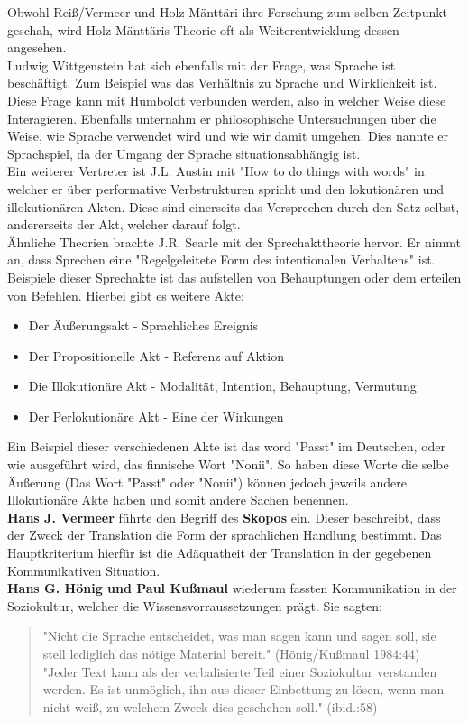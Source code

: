 \documentclass{article}
\begin{document}
	Obwohl Reiß/Vermeer und Holz-Mänttäri ihre Forschung zum selben Zeitpunkt geschah, wird Holz-Mänttäris Theorie oft als Weiterentwicklung dessen angesehen. \\
	Ludwig Wittgenstein hat sich ebenfalls mit der Frage, was Sprache ist beschäftigt. Zum Beispiel was das Verhältnis zu Sprache und Wirklichkeit ist. Diese Frage kann mit Humboldt verbunden werden, also in welcher Weise diese Interagieren. Ebenfalls unternahm er philosophische Untersuchungen über die Weise, wie Sprache verwendet wird und wie wir damit umgehen. Dies nannte er Sprachspiel, da der Umgang der Sprache situationsabhängig ist. \\
	Ein weiterer Vertreter ist J.L. Austin mit "How to do things with words" in welcher er über performative Verbstrukturen spricht und den lokutionären und illokutionären Akten. Diese sind einerseits das Versprechen durch den Satz selbst, andererseits der Akt, welcher darauf folgt. \\
	Ähnliche Theorien brachte J.R. Searle mit der Sprechakttheorie hervor. Er nimmt an, dass Sprechen eine "Regelgeleitete Form des intentionalen Verhaltens" ist. Beispiele dieser Sprechakte ist das aufstellen von Behauptungen oder dem erteilen von Befehlen.
	Hierbei gibt es weitere Akte:
	\begin{itemize}
		\item{Der Äußerungsakt - Sprachliches Ereignis}
		\item{Der Propositionelle Akt - Referenz auf Aktion}
		\item{Die Illokutionäre Akt - Modalität, Intention, Behauptung, Vermutung}
		\item{Der Perlokutionäre Akt - Eine der Wirkungen}
	\end{itemize}

	Ein Beispiel dieser verschiedenen Akte ist das word "Passt" im Deutschen, oder wie ausgeführt wird, das finnische Wort "Nonii". So haben diese Worte die selbe Äußerung (Das Wort "Passt" oder "Nonii") können jedoch jeweils andere Illokutionäre Akte haben und somit andere Sachen benennen. \\
	\textbf{Hans J. Vermeer} führte den Begriff des \textbf{Skopos} ein. Dieser beschreibt, dass der Zweck der Translation die Form der sprachlichen Handlung bestimmt. Das Hauptkriterium hierfür ist die Adäquatheit der Translation in der gegebenen Kommunikativen Situation. \\
	\textbf{Hans G. Hönig und Paul Kußmaul} wiederum fassten Kommunikation in der Soziokultur, welcher die Wissensvorraussetzungen prägt. Sie sagten:
	\begin{quote}
	"Nicht die Sprache entscheidet, was man sagen kann und sagen soll, sie stell lediglich das nötige Material bereit." (Hönig/Kußmaul 1984:44) \\
	"Jeder Text kann als der verbalisierte Teil einer Soziokultur verstanden werden. Es ist unmöglich, ihn aus dieser Einbettung zu lösen, wenn man nicht weiß, zu welchem Zweck dies geschehen soll." (ibid.:58)
	\end{quote}
\end{document}
